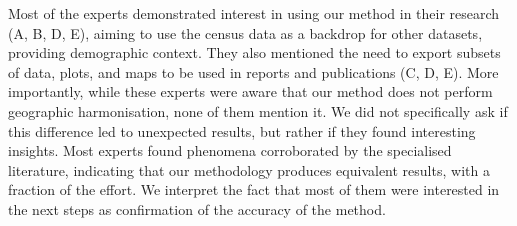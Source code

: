 Most of the experts demonstrated interest in using our method in their research
(A, B, D, E), aiming to use the census data as a backdrop for other datasets,
providing demographic context. They also mentioned the need to export subsets of
data, plots, and maps to be used in reports and publications (C, D, E). More
importantly, while these experts were aware that our method does not perform
geographic harmonisation, none of them mention it. We did not specifically ask
if this difference led to unexpected results, but rather if they found
interesting insights. Most experts found phenomena corroborated by the
specialised literature, indicating that our methodology produces equivalent
results, with a fraction of the effort. We interpret the fact that most of them
were interested in the next steps as confirmation of the accuracy of the method.